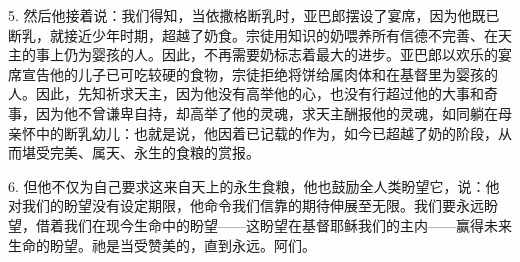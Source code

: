 5. 然后他接着说：我们得知，当依撒格断乳时，亚巴郎摆设了宴席，因为他既已断乳，就接近少年时期，超越了奶食。宗徒用知识的奶喂养所有信德不完善、在天主的事上仍为婴孩的人。因此，不再需要奶标志着最大的进步。亚巴郎以欢乐的宴席宣告他的儿子已可吃较硬的食物，宗徒拒绝将饼给属肉体和在基督里为婴孩的人。因此，先知祈求天主，因为他没有高举他的心，也没有行超过他的大事和奇事，因为他不曾谦卑自持，却高举了他的灵魂，求天主酬报他的灵魂，如同躺在母亲怀中的断乳幼儿：也就是说，他因着已记载的作为，如今已超越了奶的阶段，从而堪受完美、属天、永生的食粮的赏报。\par

6. 但他不仅为自己要求这来自天上的永生食粮，他也鼓励全人类盼望它，说：他对我们的盼望没有设定期限，他命令我们信靠的期待伸展至无限。我们要永远盼望，借着我们在现今生命中的盼望——这盼望在基督耶稣我们的主内——赢得未来生命的盼望。祂是当受赞美的，直到永远。阿们。\par

